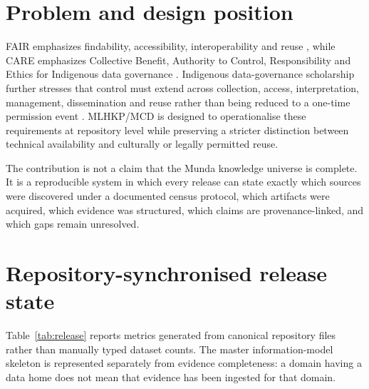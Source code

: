 \documentclass[11pt]{article}
\begin{document}
\section{Problem and design position}
FAIR emphasizes findability, accessibility, interoperability and reuse \parencite{wilkinson2016fair}, while CARE emphasizes Collective Benefit, Authority to Control, Responsibility and Ethics for Indigenous data governance \parencite{carroll2020care}. Indigenous data-governance scholarship further stresses that control must extend across collection, access, interpretation, management, dissemination and reuse rather than being reduced to a one-time permission event \parencite{williamson2023sovereignty}. MLHKP/MCD is designed to operationalise these requirements at repository level while preserving a stricter distinction between technical availability and culturally or legally permitted reuse.

The contribution is not a claim that the Munda knowledge universe is complete. It is a reproducible system in which every release can state exactly which sources were discovered under a documented census protocol, which artifacts were acquired, which evidence was structured, which claims are provenance-linked, and which gaps remain unresolved.

\section{Repository-synchronised release state}
Table~\ref{tab:release} reports metrics generated from canonical repository files rather than manually typed dataset counts. The master information-model skeleton is represented separately from evidence completeness: a domain having a data home does not mean that evidence has been ingested for that domain.
\end{document}
